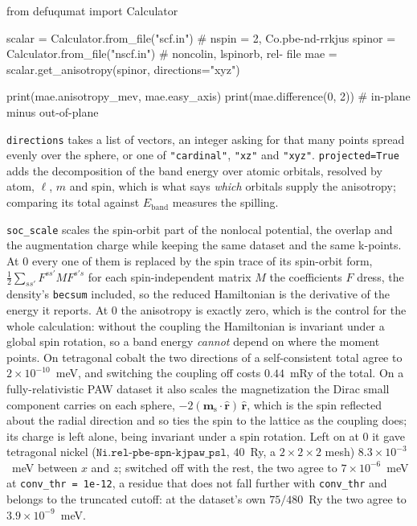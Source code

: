 \documentclass[11pt,a4paper]{article}
\newcommand{\code}[1]{\texttt{\small #1}}
\begin{document}
\begin{pycode}
from defuqumat import Calculator

scalar = Calculator.from_file("scf.in")          # nspin = 2, Co.pbe-nd-rrkjus
spinor = Calculator.from_file("nscf.in")         # noncolin, lspinorb, rel- file
mae = scalar.get_anisotropy(spinor, directions="xyz")

print(mae.anisotropy_mev, mae.easy_axis)
print(mae.difference(0, 2))                      # in-plane minus out-of-plane
\end{pycode}

\code{directions} takes a list of vectors, an integer asking for that many
points spread evenly over the sphere, or one of \code{"cardinal"},
\code{"xz"} and \code{"xyz"}. \code{projected=True} adds the decomposition of
the band energy over atomic orbitals, resolved by atom, $\ell$, $m$ and spin,
which is what says \emph{which} orbitals supply the anisotropy; comparing its
total against $E_{\text{band}}$ measures the spilling.

\code{soc\_scale} scales the spin-orbit part of the nonlocal potential, the
overlap and the augmentation charge while keeping the same dataset and the same
k-points. At $0$ every one of them is replaced by the spin trace of its
spin-orbit form, $\tfrac12\sum_{s s'} F^{s s'} M F^{s' s}$ for each
spin-independent matrix $M$ the coefficients $F$ dress, the density's
\code{becsum} included, so the reduced Hamiltonian is the derivative of the
energy it reports. At $0$ the anisotropy is exactly zero, which is the control
for the whole calculation: without the coupling the Hamiltonian is invariant
under a global spin rotation, so a band energy \emph{cannot} depend on where the
moment points. On tetragonal cobalt the two directions of a self-consistent
total agree to $2\times10^{-10}$~meV, and switching the coupling off costs
$0.44$~mRy of the total. On a fully-relativistic PAW dataset it also scales the
magnetization the Dirac small component carries on each sphere,
$-2(\mathbf m_{\text{s}}\cdot\hat{\mathbf r})\,\hat{\mathbf r}$, which is the
spin reflected about the radial direction and so ties the spin to the lattice as
the coupling does; its charge is left alone, being invariant under a spin
rotation. Left on at $0$ it gave tetragonal nickel
($\texttt{Ni.rel-pbe-spn-kjpaw\_psl}$, $40$~Ry, a $2\times2\times2$ mesh)
$8.3\times10^{-3}$~meV between $x$ and $z$; switched off with the rest, the two
agree to $7\times10^{-6}$~meV at \code{conv\_thr = 1e-12}, a residue that
does not fall further with \code{conv\_thr} and belongs to the truncated cutoff:
at the dataset's own $75/480$~Ry the two agree to $3.9\times10^{-9}$~meV.
\end{document}
